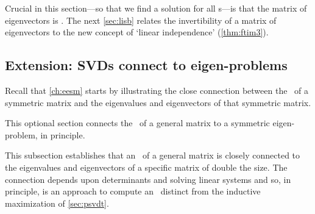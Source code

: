 Crucial in this section---so that we find a solution for all s---is that the matrix of eigenvectors is .
The next \autoref{sec:lisb} relates the invertibility of a matrix of eigenvectors to the new concept of `linear independence' (\autoref{thm:ftim3}).

\subsection{Extension: SVDs connect to eigen-problems}

Recall that \autoref{ch:eesm} starts by illustrating the close connection between the \svd\ of a symmetric matrix and the eigenvalues and eigenvectors of that symmetric matrix.
\begin{aside}
This optional section connects the \svd\ of a general matrix to a symmetric eigen-problem, in principle.
\end{aside}%
This subsection establishes that an \svd\ of a general matrix is closely connected to the eigenvalues and eigenvectors of a specific matrix of double the size.   
The connection depends upon determinants and solving linear systems and so, in principle, is an approach to compute an \svd\ distinct from the inductive maximization of \autoref{sec:psvdt}.



